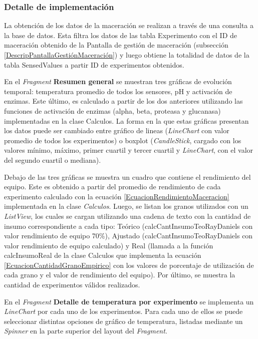             \subsubsection{Detalle de implementación}
            \par La obtención de los datos de la maceración se realizan a través de una consulta a la base de datos. Esta filtra los datos de las tabla Experimento con el ID de maceración obtenido de la Pantalla de gestión de maceración (subsección \ref{DescripPantallaGestiónMaceración}) y luego obtiene la totalidad de datos de la tabla SensedValues a partir ID de experimentos obtenidos.
            
            \par En el \textit{Fragment} \textbf{Resumen general} se muestran tres gráficas de evolución temporal: temperatura promedio de todos los sensores, pH y activación de enzimas. Este último, es calculado a partir de los dos anteriores utilizando las funciones de activación de enzimas (alpha, beta, proteasa y glucanasa) implementadas en la clase Calculos. La forma en la que estas gráficas presentan los datos puede ser cambiado entre gráfico de lineas (\textit{LineChart} con valor promedio de todos los experimentos) o boxplot (\textit{CandleStick}, cargado con los valores mínimo, máximo, primer cuartil y tercer cuartil y \textit{LineChart}, con el valor del segundo cuartil o mediana).
            
            \par Debajo de las tres gráficas se muestra un cuadro que contiene el rendimiento del equipo. Este es obtenido a partir del promedio de rendimiento de cada experimento calculado con la ecuación \ref{EcuacionRendimientoMaceracion} implementada en la clase \textit{Calculos}. Luego, se listan los granos utilizados con un \textit{ListView}, los cuales se cargan utilizando una cadena de texto con la cantidad de insumo correspondiente a cada tipo: Teórico (calcCantInsumoTeoRayDaniels con valor rendimiento de equipo 70\%), Ajustado (calcCantInsumoTeoRayDaniels con valor rendimiento de equipo calculado) y Real (llamada a la función calcInsumoReal de la clase Calculos que implementa la ecuación  \ref{EcuacionCantidadGranoEmpirico} con los valores de porcentaje de utilización de cada grano y el valor de rendimiento del equipo). Por último, se muestra la cantidad de experimentos válidos realizados.
            
            \par En el \textit{Fragment} \textbf{Detalle de temperatura por experimento} se implementa un \textit{LineChart} por cada uno de los experimentos. Para cada uno de ellos se puede seleccionar distintas opciones de gráfico de temperatura, listadas mediante un \textit{Spinner} en la parte superior del layout del \textit{Fragment}.
            
